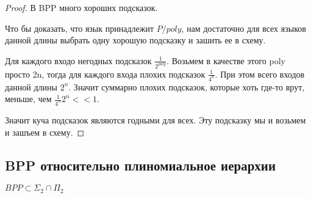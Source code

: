 \begin{proof}
	В BPP много хороших подсказок. 

	Что бы доказать, что язык принадлежит $P/poly$, нам достаточно для всех языков 
	данной длины выбрать одну хорошую подсказку и зашить ее в схему.

	Для каждого входо негодных подсказок $\frac{1}{2^{poly}} $. Возьмем в качестве этого poly просто 2n, 
	тогда для каждого входа плохих подсказок $\frac{1}{4^n}$. При этом всего входов данной длины $2^n$. Значит 
	суммарно плохих подсказок, которые хоть где-то врут, меньше, чем $\frac{1}{4^n}2^n << 1$.

	Значит куча подсказок являются годными для всех. Эту подсказку мы и возьмем и зашъем в схему.
\end{proof}

\subsection{BPP относительно плиномиальное иерархии}
\begin {theorem}
	$BPP \subset \Sigma_2 \cap \Pi_2$\\
\end{theorem}


